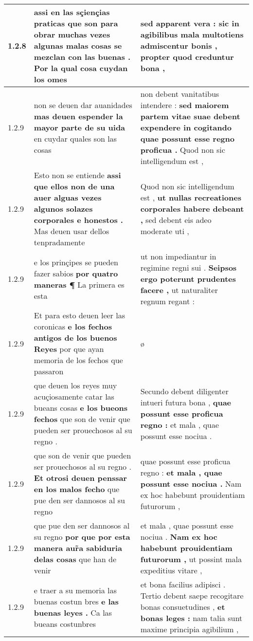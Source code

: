 \begin{tabular}{|p{1cm}|p{6.5cm}|p{6.5cm}|}
1.2.8 & assi en las sçiençias praticas \textbf{ que son para obrar muchas vezes algunas malas cosas se mezclan con las buenas . } Por la qual cosa cuydan los omes & sed apparent vera : \textbf{ sic in agibilibus mala multotiens admiscentur bonis , } propter quod creduntur bona , \\\hline
1.2.9 & non se deuen dar auanidades \textbf{ mas deuen espender la mayor parte de su uida } en cuydar quales son las cosas & non debent vanitatibus intendere : \textbf{ sed maiorem partem vitae suae debent expendere in cogitando quae possunt esse regno proficua . } Quod non sic intelligendum est , \\\hline
1.2.9 & Esto non se entiende \textbf{ assi que ellos non de una auer alguas vezes algunos solazes corporales e honestos . } Mas deuen usar dellos tenpradamente & Quod non sic intelligendum est , \textbf{ ut nullas recreationes corporales habere debeant , } sed debent eis adeo moderate uti , \\\hline
1.2.9 & e los prinçipes se pueden fazer sabios \textbf{ por quatro maneras ¶ } La primera es esta & ut non impediantur in regimine regni sui . \textbf{ Seipsos ergo poterunt prudentes facere , } ut naturaliter regnum regant : \\\hline
1.2.9 & Et para esto deuen leer las coronicas \textbf{ e los fechos antigos de los buenos Reyes } por que ayan memoria de los fechos que passaron & ø \\\hline
1.2.9 & que deuen los reyes muy acuçiosamente catar las bueans cosas \textbf{ e los bueons fechos } que son de venir que pueden ser prouechosos al su regno . & Secundo debent diligenter intueri futura bona , \textbf{ quae possunt esse proficua regno : } et mala , quae possunt esse nociua . \\\hline
1.2.9 & que son de venir que pueden ser prouechosos al su regno . \textbf{ Et otrosi deuen penssar en los malos fecho } que pue den ser dannosos al su regno & quae possunt esse proficua regno : \textbf{ et mala , quae possunt esse nociua . } Nam ex hoc habebunt prouidentiam futurorum , \\\hline
1.2.9 & que pue den ser dannosos al su regno \textbf{ por que por esta manera aur̃a sabiduria delas cosas } que han de venir & et mala , quae possunt esse nociua . \textbf{ Nam ex hoc habebunt prouidentiam futurorum , } ut possint mala expeditius vitare , \\\hline
1.2.9 & e traer a su memoria las buenas costun bres \textbf{ e las buenas leyes . } Ca las bueans costunbres & et bona facilius adipisci . Tertio debent saepe recogitare bonas consuetudines , \textbf{ et bonas leges : } nam talia sunt maxime principia agibilium , \\\hline

\end{tabular}
